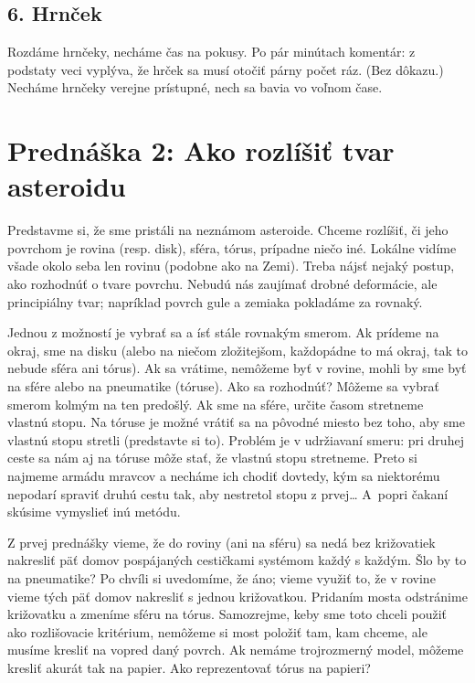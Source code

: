 \documentclass[a4paper]{article}
\begin{document}
\smallskip
{}

\subsection*{6. Hrnček}
Rozdáme hrnčeky, necháme čas na pokusy. Po pár minútach komentár: z podstaty veci vyplýva, že hrček sa musí otočiť párny počet ráz. (Bez dôkazu.) Necháme hrnčeky verejne prístupné, nech sa bavia vo voľnom čase.


\section*{Prednáška 2: Ako rozlíšiť tvar asteroidu}

Predstavme si, že sme pristáli na neznámom asteroide. Chceme rozlíšiť, či jeho povrchom je rovina (resp. disk), sféra, tórus, prípadne niečo iné.
Lokálne vidíme všade okolo seba len rovinu (podobne ako na Zemi). Treba nájsť nejaký postup, ako rozhodnúť o tvare povrchu. Nebudú nás zaujímať drobné deformácie, ale principiálny tvar; napríklad povrch gule a zemiaka pokladáme za rovnaký.

Jednou z možností je vybrať sa a ísť stále rovnakým smerom. Ak prídeme na okraj, sme na disku (alebo na niečom zložitejšom, každopádne to má okraj, tak to nebude sféra ani tórus). Ak sa vrátime, nemôžeme byť v rovine, mohli by sme byť na sfére alebo na pneumatike (tóruse). Ako sa rozhodnúť? Môžeme sa vybrať smerom kolmým na ten predošlý. Ak sme na sfére, určite časom stretneme vlastnú stopu. Na tóruse je možné vrátiť sa na pôvodné miesto bez toho, aby sme vlastnú stopu stretli (predstavte si to). Problém je v udržiavaní smeru: pri druhej ceste sa nám aj na tóruse môže stať, že vlastnú stopu stretneme. Preto si najmeme armádu mravcov a necháme ich chodiť dovtedy, kým sa niektorému nepodarí spraviť druhú cestu tak, aby nestretol stopu z prvej\dots{} A~popri čakaní skúsime vymyslieť inú metódu.

Z prvej prednášky vieme, že do roviny (ani na sféru) sa nedá bez križovatiek nakresliť päť domov pospájaných cestičkami systémom každý s každým. Šlo by to na pneumatike?
Po chvíli si uvedomíme, že áno; vieme využiť to, že v rovine vieme tých päť domov nakresliť s jednou križovatkou. Pridaním mosta odstránime križovatku a zmeníme sféru na tórus. Samozrejme, keby sme toto chceli použiť ako rozlišovacie kritérium, nemôžeme si most položiť tam, kam chceme, ale musíme kresliť na vopred daný povrch. Ak nemáme trojrozmerný model, môžeme kresliť akurát tak na papier. Ako reprezentovať tórus na papieri?
\end{document}

